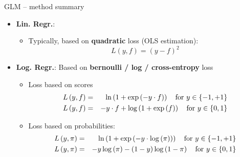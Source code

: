 \begin{frame2}{GLM -- method summary}

\begin{itemize}
  \item \textbf{Lin. Regr.}:
  \begin{itemize}
    
    \item Typically, based on \textbf{quadratic} loss (OLS estimation): 
    $$L\left(y, f\right) = \left(y - f \right)^2$$ %
  \end{itemize}
  \item \textbf{Log. Regr.}: Based on \textbf{bernoulli / log / cross-entropy} loss ~ 
  \begin{itemize}
      \item Loss based on scores
      \begin{eqnarray*}
    L\left(y, f\right) &=& \ln\left(1+\exp\left(-y \cdot f\right)\right) \quad \text{for } y \in \{-1, +1\}\\
    L\left(y, f\right) &=& - y \cdot f + \log\left(1 + \exp\left(f\right)\right) \quad \text{for } y \in \{0, 1\} 
    \end{eqnarray*}
    \item Loss based on probabilities:
      \begin{eqnarray*}
    L\left(y, \pi\right) &=& \ln\left(1+\exp\left(-y \cdot \log \left(\pi\right)\right)\right) \quad \text{for } y \in \{-1, +1\}\\
    L\left(y, \pi\right) &=& -y \log \left(\pi\right) - (1 - y) \log \left(1 - \pi \right)  \quad \text{for } y \in \{0, 1\} 
    \end{eqnarray*}
  \end{itemize}
\end{itemize}

\end{frame2}



